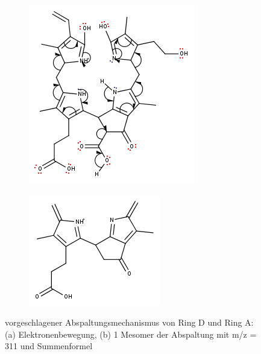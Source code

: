 \begin{figure}[!htbp]
  \begin{subfigure}[b]{0.5\textwidth}
    \includegraphics[width=\textwidth]{figures/Kapitel7/Kataboliten/fragmentation_structures/VWA_Katabolit_619_MH-CO2-RingA-RIngD_311_electronMovement.png}
    \caption{}
    \label{fig:619MHElectronMovement}
  \end{subfigure}
  \hfill
  \begin{subfigure}[b]{0.5\textwidth}
    \includegraphics[width=\textwidth]{figures/Kapitel7/Kataboliten/fragmentation_structures/VWA_Katabolit_619-CO2-RingA-RingD_311.png}
    \caption{}
    \label{fig:311MHMesomer1}
  \end{subfigure}
  \caption[Abspaltungsmechanismus von Ring D und Ring A, Quelle: Autor]{vorgeschlagener Abspaltungsmechanismus von Ring D und Ring A: (a) Elektronenbewegung, (b) 1 Mesomer der Abspaltung mit m/z = 311 und Summenformel \ch{}}
\end{figure}
